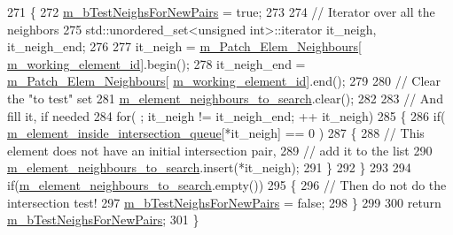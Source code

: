 \begin{DoxyCode}
271 \{
272     \hyperlink{classcarl_1_1_patch__construction_a767adbbf39494b58d1f9d1dd65afce24}{m\_bTestNeighsForNewPairs} = \textcolor{keyword}{true};
273 
274     \textcolor{comment}{// Iterator over all the neighbors}
275     std::unordered\_set<unsigned int>::iterator it\_neigh, it\_neigh\_end;
276 
277     it\_neigh        = \hyperlink{classcarl_1_1_patch__construction_a47c4343835537781c48813feed01e60e}{m\_Patch\_Elem\_Neighbours}[
      \hyperlink{classcarl_1_1_patch__construction_a7889a62e6717124c405bc508b03f3254}{m\_working\_element\_id}].begin();
278     it\_neigh\_end    = \hyperlink{classcarl_1_1_patch__construction_a47c4343835537781c48813feed01e60e}{m\_Patch\_Elem\_Neighbours}[
      \hyperlink{classcarl_1_1_patch__construction_a7889a62e6717124c405bc508b03f3254}{m\_working\_element\_id}].end();
279 
280     \textcolor{comment}{// Clear the "to test" set}
281     \hyperlink{classcarl_1_1_patch__construction_a73186b0129fff50276de0c1eabd5ea0d}{m\_element\_neighbours\_to\_search}.clear();
282 
283     \textcolor{comment}{// And fill it, if needed}
284     \textcolor{keywordflow}{for}( ; it\_neigh != it\_neigh\_end; ++ it\_neigh)
285     \{
286         \textcolor{keywordflow}{if}( \hyperlink{classcarl_1_1_patch__construction_a66d5ff525192d6aa53ea63beb95afd7d}{m\_element\_inside\_intersection\_queue}[*it\_neigh] == 0 )
287         \{
288             \textcolor{comment}{// This element does not have an initial intersection pair,}
289             \textcolor{comment}{// add it to the list}
290             \hyperlink{classcarl_1_1_patch__construction_a73186b0129fff50276de0c1eabd5ea0d}{m\_element\_neighbours\_to\_search}.insert(*it\_neigh);
291         \}
292     \}
293 
294     \textcolor{keywordflow}{if}(\hyperlink{classcarl_1_1_patch__construction_a73186b0129fff50276de0c1eabd5ea0d}{m\_element\_neighbours\_to\_search}.empty())
295     \{
296         \textcolor{comment}{// Then do not do the intersection test!}
297         \hyperlink{classcarl_1_1_patch__construction_a767adbbf39494b58d1f9d1dd65afce24}{m\_bTestNeighsForNewPairs} = \textcolor{keyword}{false};
298     \}
299 
300     \textcolor{keywordflow}{return} \hyperlink{classcarl_1_1_patch__construction_a767adbbf39494b58d1f9d1dd65afce24}{m\_bTestNeighsForNewPairs};
301 \}
\end{DoxyCode}
\hypertarget{classcarl_1_1_patch__construction_ab9183c2cdf61de07aa77b91775286733}{}
